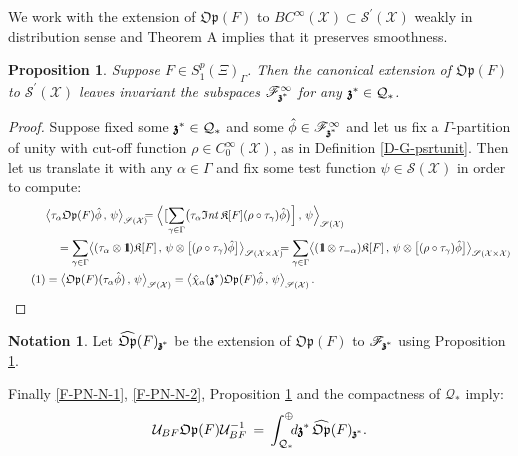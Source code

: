 \documentclass[12pt]{article}
\newtheorem{proposition}[theorem]{Proposition}
\theoremstyle{definition}
\newtheorem{notation}[theorem]{Notation}
\newcommand\numberthis{\addtocounter{equation}{1}\tag{\theequation}}
\def\Op{\mathfrak{Op}}
\def\X{\mathcal X}
\def\U{\mathcal{U}}
\def\T{\mathcal{Q}}
\def\bb1{{\rm{1}\hspace{-3pt}\mathbf{l}}}
\def\Int{\mathfrak{I}\mathit{nt}}
\def\bz{\mathfrak{z}\hspace*{-4pt}\mathfrak{z}}
\def\beq{\begin{equation}}
\def\eeq{\end{equation}}
\numberwithin{equation}{section}
\begin{document}
We work with the extension of $\Op(F)$ to $BC^\infty(\X)\subset\mathscr{S}^\prime(\X)$ weakly in distribution sense and Theorem A implies that it preserves smoothness.

\begin{proposition}\label{P-Fzst-inv}
Suppose $F\in{S}^p_1(\Xi)_{\Gamma}$. Then the canonical extension of $\Op(F)$ to $\mathscr{S}^\prime(\X)$ leaves invariant the subspaces $\mathscr{F}^\infty_{\bz^*}$ for any $\bz^*\in\T_*$.
\end{proposition}
\begin{proof}
Suppose fixed some $\bz^*\in\T_*$ and some $\hat{\phi}\in\mathscr{F}_{\bz^*}^\infty$ and let us fix a $\Gamma$-partition of unity with cut-off function $\rho\in{C}^\infty_0(\X)$, as in Definition \ref{D-G-psrtunit}. Then  let us translate it with any $\alpha\in\Gamma$ and fix some test function $\psi\in\mathscr{S}(\X)$ in order to compute:
\begin{align*}
	&\big\langle\tau_{\alpha}\Op(F)\hat{\phi}\,,\,\psi\big\rangle_{\mathscr{S}(\X)}\hspace*{-0.2cm}=\Big\langle\big[\underset{\gamma\in\Gamma}{\sum}\big(\tau_{\alpha}\Int\,\mathfrak{K}[F](\rho\circ\tau_\gamma)\hat{\phi}\big)\Big]\,,\,\psi\Big\rangle_{\mathscr{S}(\X)}\hspace*{-0.3cm}\\
	&\quad=\underset{\gamma\in\Gamma}{\sum}\big\langle(\tau_{\alpha}\otimes\bb1)\mathfrak{K}[F]\,,\,\psi\otimes\big[(\rho\circ\tau_\gamma)\hat{\phi}\big]\big\rangle_{\mathscr{S}(\X\times\X)}\hspace*{-0.2cm}=\underset{\gamma\in\Gamma}{\sum}\big\langle(\bb1\otimes\tau_{-\alpha})\mathfrak{K}[F]\,,\,\psi\otimes\big[(\rho\circ\tau_\gamma)\hat{\phi}\big]\big\rangle_{\mathscr{S}(\X\times\X)}\\ \numberthis\label{F-PN-N-3}
	&=\big\langle\Op(F)(\tau_{\alpha}\hat{\phi})\,,\,\psi\big\rangle_{\mathscr{S}(\X)}=\big\langle\hat{\chi}_{\alpha}(\bz^*)\Op(F)\hat{\phi}\,,\,\psi\big\rangle_{\mathscr{S}(\X)}\,.  
\end{align*}
\end{proof}

\begin{notation}\label{N-Fzst-inv}
Let $\widehat{\Op}(F)_{\bz^*}$ be the extension of $\Op(F)$ to $\mathscr{F}_{\bz^*}$ using Proposition \ref{P-Fzst-inv}.
\end{notation}
Finally \eqref{F-PN-N-1}, \eqref{F-PN-N-2}, Proposition \ref{P-Fzst-inv} and the compactness of $\T_*$ imply:
\beq\label{DF-OpABF}
\U_{BF}\Op(F)\U_{BF}^{-1}\,=\,\int_{{\T}_*}^{\oplus}\hspace*{-4pt}d\bz^*\,\widehat{\Op}(F)_{\bz^*}.
\eeq
\end{document}
